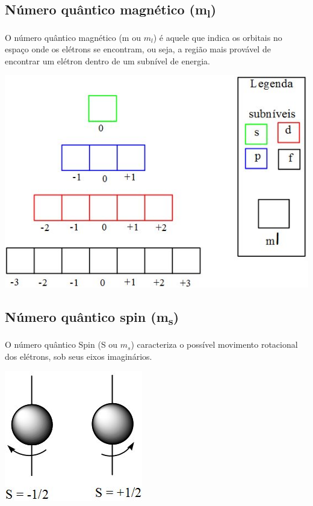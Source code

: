\documentclass[10pt]{scrartcl}
\begin{document}
\subsection{Número quântico magnético (m\textsubscript{l})}
\label{sec:org8958f1a}

O número quântico magnético (m ou \(m_l\)) é aquele que indica os orbitais no espaço onde os elétrons se encontram, ou seja, a região mais provável de encontrar um elétron dentro de um subnível de energia.
\begin{center}
\includegraphics[scale=.4]{Quimica-Geral-Aula/numero-quantico-magnetico.jpg}
\end{center}

\subsection{Número quântico spin (m\textsubscript{s})}
\label{sec:org12a0ca6}

O número quântico Spin (S ou \(m_s\)) caracteriza o possível movimento rotacional dos elétrons, sob seus eixos imaginários.
\begin{center}
\includegraphics[scale=.4]{Quimica-Geral-Aula/numero-quantico-spin.jpg}
\end{center}
\end{document}
